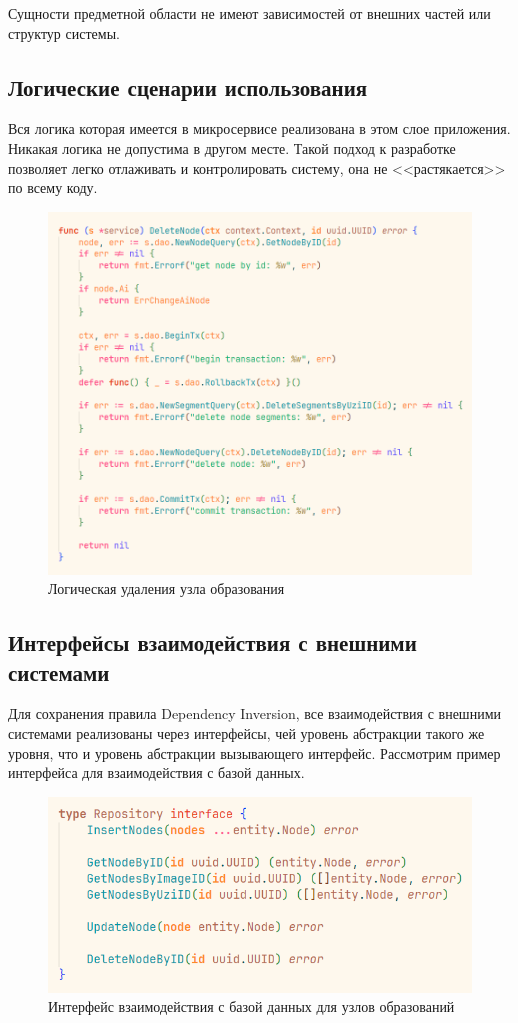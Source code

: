Сущности предметной области не имеют зависимостей от внешних частей или структур системы.

\subsection{Логические сценарии использования}
Вся логика которая имеется в микросервисе реализована в этом слое приложения. Никакая логика не допустима в другом месте. 
Такой подход к разработке позволяет легко отлаживать и контролировать систему, она не <<растякается>> по всему коду.

\begin{figure}[H]%
	\begin{center}
		\includegraphics[width=.7\columnwidth]{./img/new/logical.png}%
	\end{center}
	\caption{Логическая удаления узла образования}%
	\label{pic:logical}%
\end{figure}

\subsection{Интерфейсы взаимодействия с внешними системами}
Для сохранения правила Dependency Inversion, все взаимодействия с внешними системами реализованы через интерфейсы, чей уровень
абстракции такого же уровня, что и уровень абстракции вызывающего интерфейс. Рассмотрим пример интерфейса для взаимодействия с 
базой данных.

\begin{figure}[H]%
	\begin{center}
		\includegraphics[width=.7\columnwidth]{./img/new/repository.png}%
	\end{center}
	\caption{Интерфейс взаимодействия с базой данных для узлов образований}%
	\label{pic:repository}%
\end{figure}

